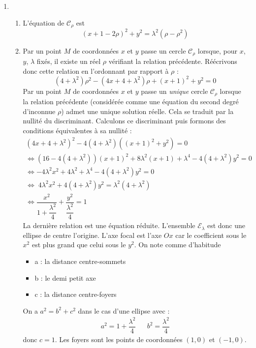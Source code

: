\begin{enumerate}
\item \begin{enumerate}
 \item L'équation de $\mathcal C_\rho$ est
\begin{displaymath}
 (x+1-2\rho)^2 + y^2 = \lambda^2(\rho - \rho^2)
\end{displaymath}
\item Par un point $M$ de coordonnées $x$ et $y$ passe un cercle $\mathcal C_\rho$ lorsque, pour $x$, $y$, $\lambda$ fixés, il existe un réel $\rho$ vérifiant la relation précédente. Réécrivons donc cette relation en l'ordonnant par rapport à $\rho$ :
\begin{equation*}
 (4+\lambda^2)\rho^2 -(4x+4+\lambda^2)\rho + (x+1)^2 + y^2 =0
\end{equation*}
Par un point $M$ de coordonnées $x$ et $y$ passe un \emph{unique} cercle $\mathcal C_\rho$ lorsque la relation précédente (considérée comme une équation du second degré d'inconnue $\rho$) admet une unique solution réelle. Cela se traduit par la nullité du discriminant. Calculons ce discriminant puis formons des conditions équivalentes à sa nullité :
\begin{multline*}
 (4x+4+\lambda^2)^2 -4(4+\lambda^2)((x+1)^2 + y^2) =0 \\
\Leftrightarrow  (16 -4(4+\lambda^2))(x+1)^2 + 8\lambda^2(x+1) +\lambda^4 - 4(4+\lambda^2)y^2 = 0 \\ 
\Leftrightarrow  -4\lambda^2 x^2 +4\lambda^2 +\lambda^4 - 4(4+\lambda^2)y^2 = 0 \\
\Leftrightarrow  \; 4\lambda^2 x^2 + 4(4+\lambda^2)y^2 = \lambda^2 (4+\lambda^2) \\
\Leftrightarrow  \dfrac{x^2}{1+\dfrac{\lambda^2}{4}} + \dfrac{y^2}{\dfrac{\lambda^2}{4}} = 1
\end{multline*}
La dernière relation est une équation réduite. L'ensemble $\mathcal E_\lambda$ est donc une ellipse de centre l'origine. L'axe focal est l'axe $Ox$ car le coefficient sous le $x^2$ est plus grand que celui sous le $y^2$. On note comme d'habitude
\begin{itemize}
 \item a : la distance centre-sommets
 \item b : le demi petit axe
 \item c : la distance centre-foyers 
\end{itemize}
On a $a^2=b^2+c^2$ dans le cas d'une ellipse avec :
\begin{align*}
 a^2 = 1+\dfrac{\lambda^2}{4} & & b^2 = \dfrac{\lambda^2}{4}
\end{align*}
donc $c=1$. Les foyers sont les points de coordonnées $(1,0)$ et $(-1,0)$.


\end{enumerate}
\end{enumerate}
